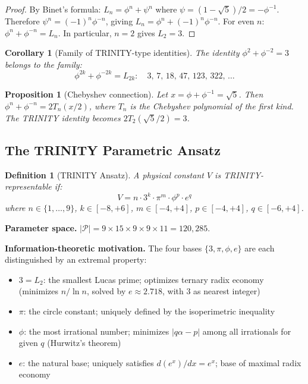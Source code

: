 \documentclass[aps,prd,preprint,superscriptaddress,showpacs,nofootinbib,longbibliography]{revtex4-2}
\newtheorem{corollary}[theorem]{Corollary}
\newtheorem{definition}{Definition}
\newtheorem{proposition}{Proposition}
\begin{document}
\begin{proof}
By Binet's formula: $L_n = \phi^n + \psi^n$ where $\psi = (1-\sqrt{5})/2 = -\phi^{-1}$. Therefore $\psi^n = (-1)^n \phi^{-n}$, giving $L_n = \phi^n + (-1)^n \phi^{-n}$. For even $n$: $\phi^n + \phi^{-n} = L_n$. In particular, $n=2$ gives $L_2 = 3$.
\end{proof}

\begin{corollary}[Family of TRINITY-type identities]
\label{cor:family}
The identity $\phi^2 + \phi^{-2} = 3$ belongs to the family:
\begin{equation}
\phi^{2k} + \phi^{-2k} = L_{2k}: \quad 3,\, 7,\, 18,\, 47,\, 123,\, 322,\, \ldots
\end{equation}
\end{corollary}

\begin{proposition}[Chebyshev connection]
\label{prop:chebyshev}
Let $x = \phi + \phi^{-1} = \sqrt{5}$. Then $\phi^n + \phi^{-n} = 2T_n(x/2)$, where $T_n$ is the Chebyshev polynomial of the first kind. The TRINITY identity becomes $2T_2(\sqrt{5}/2) = 3$.
\end{proposition}

\subsection{The TRINITY Parametric Ansatz}
\label{sec:ansatz}

\begin{definition}[TRINITY Ansatz]
\label{def:ansatz}
A physical constant $V$ is \emph{TRINITY-representable} if:
\begin{equation}
\label{eq:ansatz}
\boxed{V = n \cdot 3^k \cdot \pi^m \cdot \phi^p \cdot e^q}
\end{equation}
where $n \in \{1,\ldots,9\}$, $k \in [-8,+6]$, $m \in [-4,+4]$, $p \in [-4,+4]$, $q \in [-6,+4]$.
\end{definition}

\textbf{Parameter space.} $|\mathcal{P}| = 9 \times 15 \times 9 \times 9 \times 11 = 120{,}285$.

\textbf{Information-theoretic motivation.} The four bases $\{3, \pi, \phi, e\}$ are each distinguished by an extremal property:
\begin{itemize}[itemsep=2pt]
    \item $3 = L_2$: the smallest Lucas prime; optimizes ternary radix economy (minimizes $n/\ln n$, solved by $e \approx 2.718$, with $3$ as nearest integer)
    \item $\pi$: the circle constant; uniquely defined by the isoperimetric inequality
    \item $\phi$: the most irrational number; minimizes $|q\alpha - p|$ among all irrationals for given $q$ (Hurwitz's theorem)
    \item $e$: the natural base; uniquely satisfies $d(e^x)/dx = e^x$; base of maximal radix economy
\end{itemize}
\end{document}
